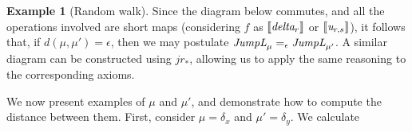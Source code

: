 \documentclass[10pt,a4paper]{amsart}
\theoremstyle{definition}
\theoremstyle{definition}
\newtheorem{example}[definition]{Example}
\theoremstyle{definition}
\theoremstyle{definition}
\theoremstyle{definition}
\theoremstyle{definition}
\begin{document}
\begin{example}[Random walk]
\begin{comment}
    Where $i_2:  \mathcal{M}\mathbb{R} \,   \widehat{\otimes}_{\pi} \,   \mathcal{M}\mathbb{R} \to  \mathcal{M} \left( \mathbb{R} \times \mathbb{R} \right) $ is an isomorphism defined as $i_{2}( \mu  \widehat{\otimes}_{\pi} \nu ) = \mu \otimes \nu $ 
    and the function $f: \mathcal{M}\mathbb{R} \times \mathcal{M}\mathbb{R}  \to \mathcal{M} \left( \mathbb{R} \times \mathbb{R} \right) $ is defined as $f((\mu, \nu)) = \mu \otimes \nu $. 
    The product measure $\mu \otimes \nu$ is defined as $\mu \otimes \nu (A \times B)= \mu(A)\cdot\nu(B).$
      This is the measure produced by the Carath\'{e}odory's extension theorem \cite{aliprantisBanachLattices1999}.
       Given that $\norm{\mu \otimes \nu}= \norm{\mu} \cdot \norm{\nu}$,  and $\norm{(\mu, \nu)}= \max\{\norm{\mu}, \norm{\nu}\}$, for $\norm{\mu} \leq 1$ and $\norm{\nu} \leq 1$, it follows that $f$ is a short map.

    \end{comment}

    Since the diagram below commutes, and all the operations involved are short maps (considering $f$ as $\left \llbracket \emph{delta}_r \right \rrbracket$ or $\left \llbracket \emph{u}_{r,s} \right \rrbracket$), it follows that, if $d(\mu, \mu')=\epsilon$, then we may postulate \(\emph{JumpL}_\mu =_{\epsilon} \emph{JumpL}_{\mu'}\). A similar diagram can be constructed using \(jr_{*}\), allowing us to apply the same reasoning to the corresponding axioms.


   We now present examples of \(\mu\) and \(\mu'\), and demonstrate how to compute the distance between them.
    First, consider $\mu=\delta_x$ and  $\mu'=\delta_y$. We calculate


\end{example}
\end{document}
